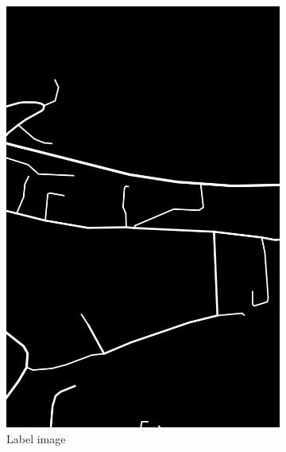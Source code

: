 \begin{figure}
\begin{subfigure}{0.32\textwidth}
\includegraphics[width=\linewidth]{figs/datasets/Norwegian_roads_label_example.png}
\caption{Label image} \label{fig:norwegian_roads_example_label}
\end{subfigure}
\hspace*{\fill} %
\begin{subfigure}{0.32\textwidth}

\end{subfigure}
\end{figure}
